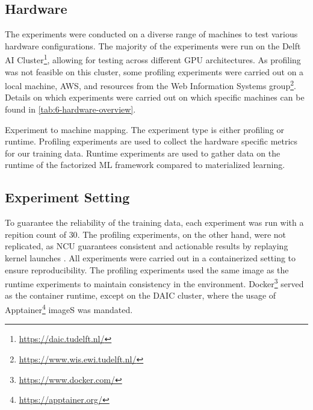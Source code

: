\subsection{Hardware}
\label{subsec:6-hardware}
The experiments were conducted on a diverse range of machines to test various hardware configurations. The majority of the experiments were run on the Delft AI Cluster\footnote{\url{https://daic.tudelft.nl/}}, allowing for testing across different GPU architectures. As profiling was not feasible on this cluster, some profiling experiments were carried out on a local machine, AWS, and resources from the Web Information Systems group\footnote{\url{https://www.wis.ewi.tudelft.nl/}}. Details on which experiments were carried out on which specific machines can be found in \autoref{tab:6-hardware-overview}.

\begin{table}[ht]
    \centering
    
    \caption[Experiment to machine mapping]{Experiment to machine mapping. The experiment type is either profiling or runtime. Profiling experiments are used to collect the hardware specific metrics for our training data. Runtime experiments are used to gather data on the runtime of the factorized ML framework compared to materialized learning.}
    \label{tab:6-hardware-overview}
\end{table}

\subsection{Experiment Setting}
To guarantee the reliability of the training data, each experiment was run with a repition count of $30$. The profiling experiments, on the other hand, were not replicated, as NCU guarantees consistent and actionable results by replaying kernel launches \cite{nsight_compute}. All experiments were carried out in a containerized setting to ensure reproducibility. The profiling experiments used the same image as the runtime experiments to maintain consistency in the environment. Docker\footnote{\url{https://www.docker.com/}} served as the container runtime, except on the DAIC cluster, where the usage of Apptainer\footnote{\url{https://apptainer.org/}} imageS was mandated.

